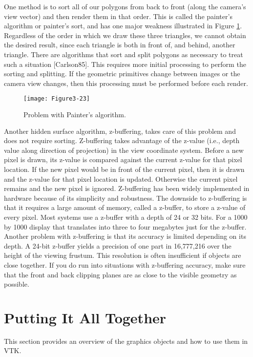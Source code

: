 One method is to sort all of our polygons from back to front (along the camera's view vector) and then render them in that order. This is called the painter's algorithm or painter's sort, and has one major weakness illustrated in Figure \ref{fig:Figure3-23}. Regardless of the order in which we draw these three triangles, we cannot obtain the desired result, since each triangle is both in front of, and behind, another triangle. There are algorithms that sort and split polygons as necessary to treat such a situation [Carlson85]. This requires more initial processing to perform the sorting and splitting. If the geometric primitives change between images or the camera view changes, then this processing must be performed before each render.

\begin{figure}[!htb]
  \centering
  \texttt{[image: Figure3-23]}\\
  \caption{Problem with Painter's algorithm.}\label{fig:Figure3-23}
\end{figure}

Another hidden surface algorithm, z-buffering, takes care of this problem and does not require sorting. Z-buffering takes advantage of the z-value (i.e., depth value along direction of projection) in the view coordinate system. Before a new pixel is drawn, its z-value is compared against the current z-value for that pixel location. If the new pixel would be in front of the current pixel, then it is drawn and the z-value for that pixel location is updated. Otherwise the current pixel remains and the new pixel is ignored. Z-buffering has been widely implemented in hardware because of its simplicity and robustness. The downside to z-buffering is that it requires a large amount of memory, called a z-buffer, to store a z-value of every pixel. Most systems use a z-buffer with a depth of 24 or 32 bits. For a 1000 by 1000 display that translates into three to four megabytes just for the z-buffer. Another problem with z-buffering is that its accuracy is limited depending on its depth. A 24-bit z-buffer yields a precision of one part in 16,777,216 over the height of the viewing frustum. This resolution is often insufficient if objects are close together. If you do run into situations with z-buffering accuracy, make sure that the front and back clipping planes are as close to the visible geometry as possible.

\section{Putting It All Together}
This section provides an overview of the graphics objects and how to
use them in VTK.

